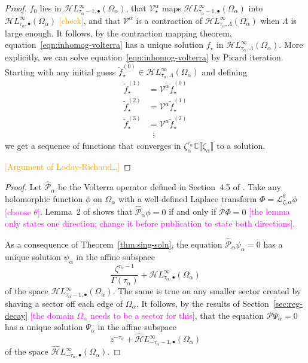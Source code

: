 \documentclass{article}
\newcommand{\singexp}[2]{\mathcal{H}L^\infty_{#1, #2}}
\newcommand{\singexpalg}[1]{\singexp{#1}{\bullet}}
\newcommand{\dualsingexp}[2]{\widehat{\mathcal{H}}L^\infty_{#1, #2}}
\newcommand{\dualsingexpalg}[1]{\dualsingexp{#1}{\bullet}}
\newcommand{\C}{\mathbb{C}}
\newcommand{\volterra}{\mathcal{V}}
\newcommand{\softpart}{\mathcal{V}_\star}
\newcommand{\solproto}{f_0}
\newcommand{\solptb}{f_\star}
\newcommand{\fmlsolptb}{\series{f}_\star}
\newcommand{\series}[1]{\tilde{#1}}
\newcommand{\laplace}{\mathcal{L}}
\theoremstyle{definition}
\theoremstyle{plain}
\begin{document}
{\begin{proof}
$\solproto$ lies in $\singexpalg{\tau_\alpha - 1}(\Omega_\alpha)$, that $\softpart^\alpha$ maps $\singexpalg{\tau_\alpha - 1}(\Omega_\alpha)$ into $\singexpalg{\tau_\alpha}(\Omega_\alpha)$ \textcolor{orange}{[check]}, and that $\volterra^\alpha$ is a contraction of $\singexp{\tau_\alpha}{\Lambda}(\Omega_\alpha)$ when $\Lambda$ is large enough. It follows, by the contraction mapping theorem, equation~\eqref{eqn:inhomog-volterra} has a unique solution $\solptb$ in $\singexp{\tau_\alpha}{\Lambda}(\Omega_\alpha)$. More explicitly, we can solve equation~\eqref{eqn:inhomog-volterra} by Picard iteration. Starting with any initial guess $\fmlsolptb^{(0)} \in \singexp{\tau_\alpha}{\Lambda}(\Omega_\alpha)$ and defining
\begin{align*}
\fmlsolptb^{(1)} & = \volterra^\alpha \fmlsolptb^{(0)} \\
\fmlsolptb^{(2)} & = \volterra^\alpha \fmlsolptb^{(1)} \\
\fmlsolptb^{(3)} & = \volterra^\alpha \fmlsolptb^{(2)} \\
& \;\;\vdots
\end{align*}
we get a sequence of functions that converges in $\zeta_\alpha^{\tau_\alpha} \C\llbracket \zeta_\alpha \rrbracket$ to a solution.

\textcolor{orange}{[Argument of Loday-Richaud\ldots]}
\end{proof}
\begin{proof}
Let $\hat{\mathcal{P}}_\alpha$ be the Volterra operator defined in Section~4.5 of \cite{reg-sing-volterra}. Take any holomorphic function $\phi$ on $\Omega_\alpha$ with a well-defined Laplace transform $\Phi = \laplace_{\zeta,\alpha}^{\theta} \phi$ \textcolor{magenta}{[choose $\theta$]}. Lemma~2 of \cite{reg-sing-volterra} shows that $\hat{\mathcal{P}}_\alpha \phi = 0$ if and only if $\mathcal{P}\Phi = 0$ \textcolor{magenta}{[the lemma only states one direction; change it before publication to state both directions]}.

As a consequence of Theorem~\ref{thm:sing-soln}, the equation $\hat{\mathcal{P}}_\alpha \psi_\alpha = 0$ has a unique solution $\psi_\alpha$ in the affine subspace
\[ \frac{\zeta^{\tau_\alpha-1}}{\Gamma(\tau_\alpha)} + \singexpalg{\tau_\alpha}(\Omega_\alpha) \]
of the space $\singexpalg{\tau_\alpha-1}(\Omega_\alpha)$. The same is true on any smaller sector created by shaving a sector off each edge of $\Omega_\alpha$. It follows, by the results of Section~\ref{sec:reg-decay} \textcolor{magenta}{[the domain $\Omega_\alpha$ needs to be a sector for this]}, that the equation $\mathcal{P}\Psi_\alpha = 0$ has a unique solution $\Psi_\alpha$ in the affine subspace
\[ z^{-\tau_\alpha} + \dualsingexpalg{-\tau_\alpha-1}(\Omega_\alpha) \]
of the space $\dualsingexpalg{-\tau_\alpha}(\Omega_\alpha)$.


\end{proof}}
\end{document}
